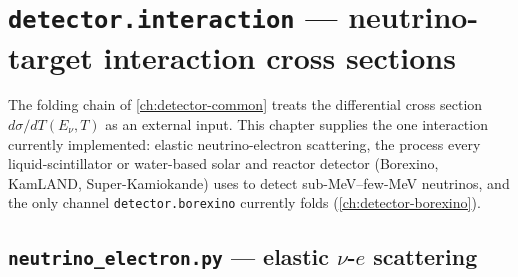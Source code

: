 \chapter{\texttt{detector.interaction} --- neutrino-target interaction cross sections}
\label{ch:detector-interaction}

The folding chain of \cref{ch:detector-common} treats the differential
cross section $d\sigma/dT(E_\nu,T)$ as an external input. This chapter
supplies the one interaction currently implemented: elastic neutrino-electron
scattering, the process every liquid-scintillator or water-based solar and
reactor detector (Borexino, KamLAND, Super-Kamiokande) uses to detect
sub-MeV--few-MeV neutrinos, and the only channel
\texttt{detector.borexino} currently folds (\cref{ch:detector-borexino}).

\section{\texttt{neutrino\_electron.py} --- elastic $\nu$-$e$ scattering}


